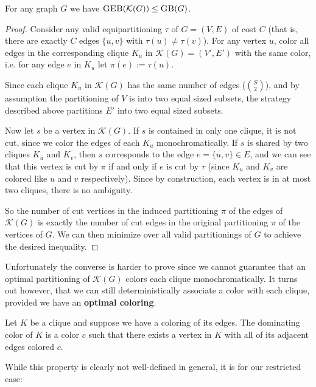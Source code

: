 \documentclass{article}
\newcommand{\sgeb}{\textsc{GEB} }
\newcommand{\sgb}{\textsc{GB} }
\begin{document}
	\begin{proposition}
		\label{geb-leq-gb}
		For any graph $G$ we have $\sgeb(\mathcal{K}(G)) \leq \sgb(G)$.
	\end{proposition}
	\begin{proof}
		Consider any valid equipartitioning $\tau$ of $G = (V, E)$ of cost
		$C$ (that is, there are
		exactly $C$ edges $\{u, v\}$ with $\tau(u) \neq \tau(v)$).
		For any vertex $u$,
		color all edges in the corresponding clique $K_u$ in $\mathcal{K}(G)
			= (V', E')$ with the same color, i.e. for any edge $e$ in $K_u$
		let $\pi(e) := \tau(u)$.

		Since each clique $K_u$ in $\mathcal{K}(G)$ has the same number of
		edges ($\binom{S}{2}$), and by
		assumption the partitioning of $V$ is into two equal sized subsets, the
		strategy described above partitions $E'$ into two equal sized subsets.

		Now let $s$ be a vertex in $\mathcal{K}(G)$. If $s$ is contained in
		only one clique, it is not cut,
		since we color the edges of
		each $K_u$ monochromatically. If $s$ is shared by two
		cliques $K_u$ and $K_v$, then $s$ corresponds to the edge
		$e = \{u, v\} \in E$, and
		we can see that this vertex is cut by $\pi$
		if and only if $e$ is cut by $\tau$ (since $K_u$ and
		$K_v$ are colored like $u$ and $v$ respectively).
		Since by construction,
		each vertex is in at most two cliques, there is no ambiguity.

		So the number of cut vertices in the induced partitioning $\pi$ of the
		edges of
		$\mathcal{K}(G)$ is exactly the number of cut edges in the original
		partitioning $\pi$ of the vertices of $G$. We can then minimize
		over all valid partitionings of $G$ to achieve the desired inequality.
	\end{proof}

	Unfortunately the converse is harder to prove since we cannot guarantee
	that an optimal partitioning of $\mathcal{K}(G)$ colors each clique
	monochromatically. It turns
	out however, that we can still deterministically associate a color with
	each clique, provided we have an \textbf{optimal coloring}.

	\begin{definition}
		Let $K$ be a clique and suppose we have a coloring of its edges. The
		dominating color of $K$ is a color $c$ such that there exists a vertex
		in $K$ with all of its adjacent edges colored $c$.
	\end{definition}

	While this property is clearly not well-defined in general, it is for our
	restricted case:
\end{document}
